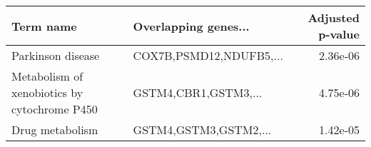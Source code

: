 \begin{tabular}{llr}
\toprule
                                   Term name &    Overlapping genes... &  Adjusted p-value \\
\midrule
                           Parkinson disease & COX7B,PSMD12,NDUFB5,... &          2.36e-06 \\
Metabolism of xenobiotics by cytochrome P450 &    GSTM4,CBR1,GSTM3,... &          4.75e-06 \\
                             Drug metabolism &   GSTM4,GSTM3,GSTM2,... &          1.42e-05 \\
\bottomrule
\end{tabular}
